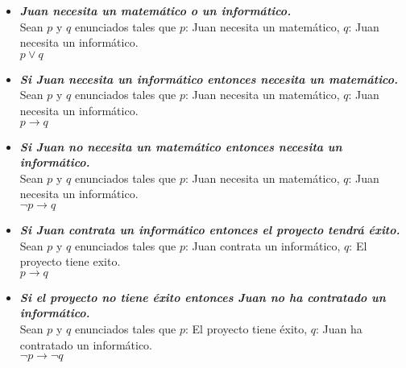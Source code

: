 \documentclass[lnbip]{svmultln}
\begin{document}
\begin{itemize}
  \item \textbf{\textit{Juan necesita un matemático o un informático.}} \\

  Sean $p$ y $q$ enunciados tales que $p$: Juan necesita un matemático, $q$: Juan necesita un informático. \\

  $p \vee q$ \\

  \item \textbf{\textit{Si Juan necesita un informático entonces necesita un matemático.}} \\

  Sean $p$ y $q$ enunciados tales que $p$: Juan necesita un matemático, $q$: Juan necesita un informático. \\

  $p \rightarrow q$ \\

  \item \textbf{\textit{Si Juan no necesita un matemático entonces necesita un informático.}} \\

  Sean $p$ y $q$ enunciados tales que $p$: Juan necesita un matemático, $q$: Juan necesita un informático. \\

  $\neg p \rightarrow q$ \\

  \item \textbf{\textit{Si Juan contrata un informático entonces el proyecto tendrá éxito.}} \\

  Sean $p$ y $q$ enunciados tales que $p$: Juan contrata un informático, $q$: El proyecto tiene exito. \\

  $p \rightarrow q$ \\

  \item \textbf{\textit{Si el proyecto no tiene éxito entonces Juan no ha contratado un informático.}} \\

  Sean $p$ y $q$ enunciados tales que $p$: El proyecto tiene éxito, $q$: Juan ha contratado un informático. \\

  $\neg p \rightarrow \neg q$ \\


\end{itemize}
\end{document}
